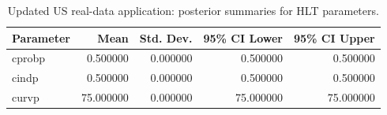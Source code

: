 \begin{table}[htbp]
\centering
\caption{Updated US real-data application: posterior summaries for HLT parameters.}
\label{tab:realdata_posterior}
\begin{tabular}{lrrrr}
\toprule
Parameter & Mean & Std. Dev. & 95\% CI Lower & 95\% CI Upper \\
\midrule
cprobp & 0.500000 & 0.000000 & 0.500000 & 0.500000 \\
cindp & 0.500000 & 0.000000 & 0.500000 & 0.500000 \\
curvp & 75.000000 & 0.000000 & 75.000000 & 75.000000 \\
\bottomrule
\end{tabular}
\end{table}

